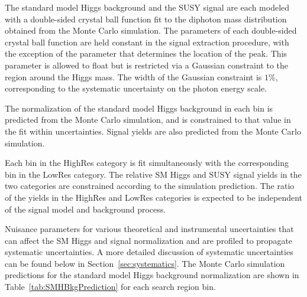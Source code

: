 The standard model Higgs background and the SUSY signal are each
modeled with a double-sided crystal ball function
fit to the diphoton mass distribution obtained from the Monte Carlo simulation.
The parameters of each double-sided crystal ball function are held constant in the signal extraction procedure, 
with the exception of the parameter that determines the location of the peak. This parameter is allowed to float
but is restricted via a Gaussian constraint to the region around the Higgs mass.
The width of the Gaussian constraint is $1\%$, corresponding to the systematic uncertainty on the photon energy 
scale.

The normalization of the standard model Higgs background in each bin 
is predicted from the Monte Carlo simulation, and is constrained 
to that value in the fit within uncertainties.
Signal yields are also predicted from the Monte Carlo simulation. 

Each bin in the HighRes category is fit simultaneously with the corresponding bin in the LowRes category.
The relative SM Higgs and SUSY signal yields in the two categories are constrained according to 
the simulation prediction. The ratio of the yields in the HighRes and LowRes
categories is expected to be independent of the signal model and background
process.

Nuisance parameters for various theoretical and instrumental uncertainties that
can affect the SM Higgs and signal normalization and are profiled to propagate systematic uncertainties.
A more detailed discussion of systematic uncertainties can be found below in 
Section~\ref{sec:systematics}. The Monte Carlo simulation predictions for the standard model Higgs background
normalization are shown in Table~\ref{tab:SMHBkgPrediction} for each search region
bin. 

